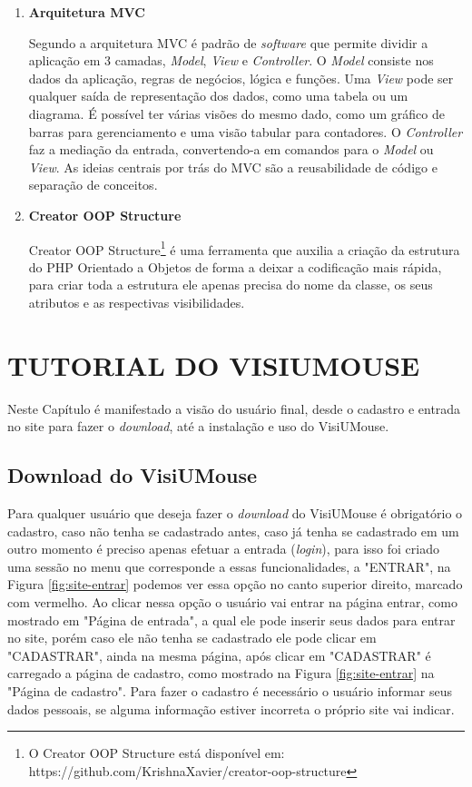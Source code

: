 \begin{enumerate}
\item \textbf{Arquitetura MVC}

Segundo  a arquitetura MVC é padrão de \textit{software} que permite dividir a aplicação em 3 camadas, \textit{Model}, \textit{View} e \textit{Controller}. O \textit{Model} consiste nos dados da aplicação, regras de negócios, lógica e funções. Uma \textit{View} pode ser qualquer saída de representação dos dados, como uma tabela ou um diagrama. É possível ter várias visões do mesmo dado, como um gráfico de barras para gerenciamento e uma visão tabular para contadores. O \textit{Controller} faz a mediação da entrada, convertendo-a em comandos para o \textit{Model} ou \textit{View}. As ideias centrais por trás do MVC são a reusabilidade de código e separação de conceitos.

\item \textbf{Creator OOP Structure}

Creator OOP Structure\footnote{O Creator OOP Structure está disponível em: https://github.com/KrishnaXavier/creator-oop-structure}  é uma ferramenta que auxilia a criação da estrutura do PHP Orientado a Objetos de forma a deixar a codificação mais rápida, para criar toda a estrutura ele apenas precisa do nome da classe, os seus atributos e as respectivas visibilidades.

\end{enumerate}


\chapter{TUTORIAL DO VISIUMOUSE}\label{CAP-tecnologia-visiumouse}
Neste Capítulo é manifestado a visão do usuário final, desde o cadastro e entrada no site para fazer o \textit{download}, até a instalação e uso do VisiUMouse. 

\section{Download do VisiUMouse}
Para qualquer usuário que deseja fazer o \textit{download} do VisiUMouse é obrigatório o cadastro, caso não tenha se cadastrado antes, caso já tenha se cadastrado em um outro momento é preciso apenas efetuar a entrada (\textit{login}), para isso foi criado uma sessão no menu que corresponde a essas funcionalidades, a "ENTRAR", na Figura \ref{fig:site-entrar} podemos ver essa opção no canto superior direito, marcado com vermelho. Ao clicar nessa opção o usuário vai entrar na página entrar, como mostrado em "Página de entrada", a qual ele pode inserir seus dados para entrar no site, porém caso ele não tenha se cadastrado ele pode clicar em "CADASTRAR", ainda na mesma página, após clicar em "CADASTRAR" é carregado a página de cadastro, como mostrado na Figura \ref{fig:site-entrar} na "Página de cadastro". Para fazer o cadastro é necessário o usuário informar seus dados pessoais, se alguma informação estiver incorreta o próprio site vai indicar. 

